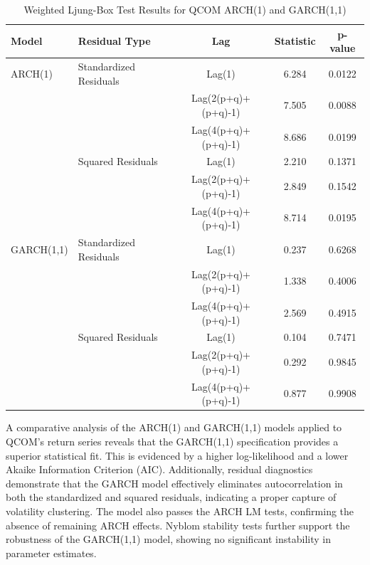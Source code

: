\documentclass[12pt]{article}
\begin{document}
\begin{table}[h!]
	\centering
	\caption{Weighted Ljung-Box Test Results for QCOM ARCH(1) and GARCH(1,1)}
	\begin{tabular}{llccc}
		\hline
		\textbf{Model} & \textbf{Residual Type} & \textbf{Lag} & \textbf{Statistic} & \textbf{p-value} \\
		\hline
		ARCH(1)   & Standardized Residuals      & Lag(1)              & 6.284   & 0.0122 \\
		&                             & Lag(2(p+q)+(p+q)-1) & 7.505   & 0.0088 \\
		&                             & Lag(4(p+q)+(p+q)-1) & 8.686   & 0.0199 \\
		& Squared Residuals           & Lag(1)              & 2.210   & 0.1371 \\
		&                             & Lag(2(p+q)+(p+q)-1) & 2.849   & 0.1542 \\
		&                             & Lag(4(p+q)+(p+q)-1) & 8.714   & 0.0195 \\
		GARCH(1,1) & Standardized Residuals     & Lag(1)              & 0.237   & 0.6268 \\
		&                            & Lag(2(p+q)+(p+q)-1) & 1.338   & 0.4006 \\
		&                            & Lag(4(p+q)+(p+q)-1) & 2.569   & 0.4915 \\
		& Squared Residuals          & Lag(1)              & 0.104   & 0.7471 \\
		&                            & Lag(2(p+q)+(p+q)-1) & 0.292   & 0.9845 \\
		&                            & Lag(4(p+q)+(p+q)-1) & 0.877   & 0.9908 \\
		\hline
	\end{tabular}
	\label{tab:qcom_combined_wlb}
\end{table}

A comparative analysis of the ARCH(1) and GARCH(1,1) models applied to QCOM’s return series reveals that the GARCH(1,1) specification provides a superior statistical fit. This is evidenced by a higher log-likelihood and a lower Akaike Information Criterion (AIC). Additionally, residual diagnostics demonstrate that the GARCH model effectively eliminates autocorrelation in both the standardized and squared residuals, indicating a proper capture of volatility clustering. The model also passes the ARCH LM tests, confirming the absence of remaining ARCH effects. Nyblom stability tests further support the robustness of the GARCH(1,1) model, showing no significant instability in parameter estimates.
\end{document}
